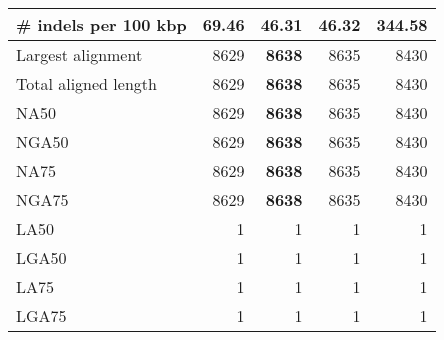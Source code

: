 \documentclass[12pt,a4paper]{article}
\begin{document}
\begin{table}[ht]
\begin{center}
\begin{tabular}{|l*{4}{|r}|}
\# indels per 100 kbp & 69.46 & {\bf 46.31} & 46.32 & 344.58 \\ \hline
Largest alignment & 8629 & {\bf 8638} & 8635 & 8430 \\ \hline
Total aligned length & 8629 & {\bf 8638} & 8635 & 8430 \\ \hline
NA50 & 8629 & {\bf 8638} & 8635 & 8430 \\ \hline
NGA50 & 8629 & {\bf 8638} & 8635 & 8430 \\ \hline
NA75 & 8629 & {\bf 8638} & 8635 & 8430 \\ \hline
NGA75 & 8629 & {\bf 8638} & 8635 & 8430 \\ \hline
LA50 & 1 & 1 & 1 & 1 \\ \hline
LGA50 & 1 & 1 & 1 & 1 \\ \hline
LA75 & 1 & 1 & 1 & 1 \\ \hline
LGA75 & 1 & 1 & 1 & 1 \\ \hline
\end{tabular}
\end{center}
\end{table}
\end{document}
